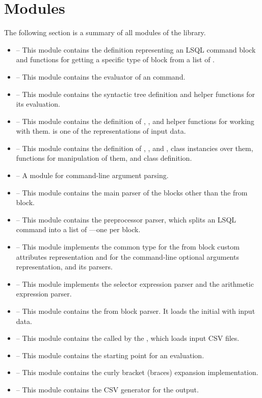 \section{Modules}
The following section is a summary of all modules of the library.
\begin{itemize}
    \item {} -- This module contains the  definition representing an LSQL command block and functions for getting a specific type of block from a list of .
    \item {} -- This module contains the evaluator of an \break{} command.
    \item {} -- This module contains the syntactic tree definition and helper functions for its evaluation.
    \item {} -- This module contains the definition of , , and helper functions for working with them.  is one of the representations of input data.
    \item {} -- This module contains the definition of , , and , class instancies over them, functions for manipulation of them, and  class definition.
    \item {} -- A module for command-line argument parsing.
    \item {} -- This module contains the main parser of the blo\-cks other than the from block.
    \item {} -- This module contains the preprocessor parser, which splits an LSQL command into a list of ---one  per block.
    \item {} -- This module implements the common  type for the from block custom attributes representation and for the co\-mmand-line optional arguments representation, and its parsers.
    \item {} -- This module implements the selector expression parser and the arithmetic expression parser.
    \item {} -- This module contains the from block parser. It loads the initial  with input data.
    \item {} -- This module contains the  called by the , which loads input CSV files.
    \item {} -- This module contains the starting point for an  evaluation.
    \item {} -- This module contains the curly bra\-cket (braces) expansion implementation.
    \item {} -- This module contains the CSV generator for the output.
\end{itemize}


